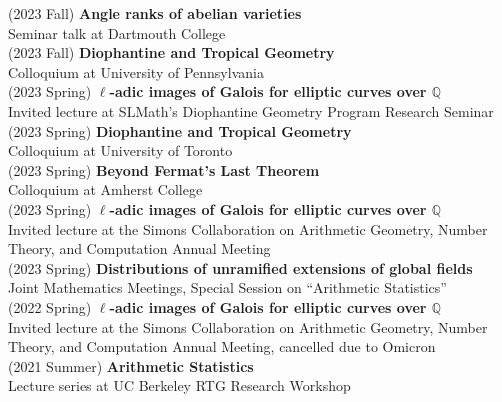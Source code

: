 \documentclass[margin,line]{res}
\begin{document}
\begin{resume}
(2023 Fall) \textbf{Angle ranks of abelian varieties}\\
Seminar talk at Dartmouth College
\vspace{.05cm}\\  
(2023 Fall) \textbf{Diophantine and Tropical Geometry}\\
Colloquium at University of Pennsylvania
\vspace{.05cm}\\  
(2023 Spring) \textbf{$\ell$-adic images of Galois for elliptic curves over $\mathbb{Q}$}\\
Invited lecture at SLMath's Diophantine Geometry Program Research Seminar
\vspace{.05cm}\\  
(2023 Spring) \textbf{Diophantine and Tropical Geometry}\\
Colloquium at University of Toronto
\vspace{.05cm}\\  
(2023 Spring) \textbf{Beyond Fermat's Last Theorem}\\
Colloquium at Amherst College
\vspace{.05cm}\\  
(2023 Spring) \textbf{$\ell$-adic images of Galois for elliptic curves over $\mathbb{Q}$}\\
Invited lecture at  the Simons Collaboration on Arithmetic Geometry, Number Theory, and Computation Annual Meeting
\vspace{.05cm}\\
(2023 Spring) \textbf{Distributions of unramified extensions of global fields}\\
Joint Mathematics Meetings, Special Session on ``Arithmetic Statistics''
\vspace{.05cm}\\
(2022 Spring) \textbf{$\ell$-adic images of Galois for elliptic curves over $\mathbb{Q}$}\\
Invited lecture at  the Simons Collaboration on Arithmetic Geometry, Number Theory, and Computation Annual Meeting, cancelled due to Omicron
\vspace{.05cm}\\
(2021 Summer) \textbf{Arithmetic Statistics}\\
Lecture series at UC Berkeley RTG Research Workshop
\vspace{.05cm}\\

\end{resume}
\end{document}
